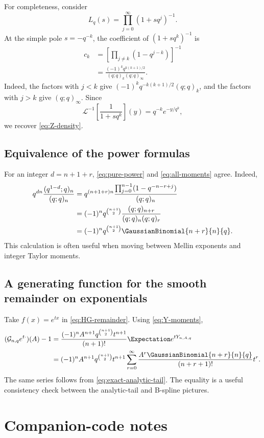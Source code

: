 \documentclass[11pt,oneside]{article}
\numberwithin{equation}{section}
\theoremstyle{definition}
\theoremstyle{remark}
\newcommand{\Gc}{\mathcal G}
\begin{document}
For completeness, consider
\[
 L_q(s)=\prod_{j=0}^{\infty}(1+sq^j)^{-1}.
\]
At the simple pole $s=-q^{-k}$, the coefficient of
$(1+sq^k)^{-1}$ is
\begin{align*}
 c_k
 &=\left[\prod_{j\ne k}(1-q^{j-k})\right]^{-1}\\
 &=\frac{(-1)^kq^{k(k+1)/2}}{(q;q)_k(q;q)_\infty}.
\end{align*}
Indeed, the factors with $j<k$ give
$(-1)^kq^{-k(k+1)/2}(q;q)_k$, and the factors with $j>k$ give
$(q;q)_\infty$.  Since
\[
 \mathcal L^{-1}\left[\frac1{1+sq^k}\right](y)
 =q^{-k}e^{-y/q^k},
\]
we recover \eqref{eq:Z-density}.

\subsection{Equivalence of the power formulas}

For an integer $d=n+1+r$, \eqref{eq:pure-power} and
\eqref{eq:all-moments} agree.  Indeed,
\begin{align*}
 q^{dn}\frac{(q^{1-d};q)_n}{(q;q)_n}
 &=q^{(n+1+r)n}
 \frac{\prod_{j=0}^{n-1}(1-q^{-n-r+j})}{(q;q)_n}\\
 &=(-1)^nq^{\binom{n+1}{2}}
 \frac{(q;q)_{n+r}}{(q;q)_n(q;q)_r}\\
 &=(-1)^nq^{\binom{n+1}{2}}\GaussianBinomial{n+r}{n}{q}.
\end{align*}
This calculation is often useful when moving between Mellin exponents and
integer Taylor moments.

\subsection{A generating function for the smooth remainder on exponentials}

Take $f(x)=e^{tx}$ in \eqref{eq:HG-remainder}.  Using
\eqref{eq:Y-moments},
\begin{align}
 (\Gc_{n,q}e^{t\cdot})(A)-1
 &=\frac{(-1)^nA^{n+1}q^{\binom{n+1}{2}}t^{n+1}}{(n+1)!}
 \Expectation e^{tY_{n,A,q}}\notag\\
 &=(-1)^nA^{n+1}q^{\binom{n+1}{2}}t^{n+1}
 \sum_{r=0}^{\infty}
 \frac{A^r\GaussianBinomial{n+r}{n}{q}}{(n+r+1)!}t^r.
 \label{eq:exp-remainder}
\end{align}
The same series follows from \eqref{eq:exact-analytic-tail}.  The equality is a
useful consistency check between the analytic-tail and B-spline pictures.

\section{Companion-code notes}
\end{document}
